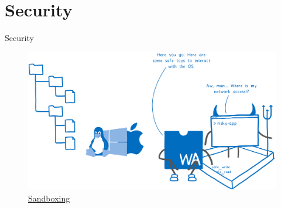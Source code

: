 \documentclass{beamer}
\begin{document}
\section{Security}

\begin{frame}{Security}
    \begin{figure}
        \includegraphics[scale=0.07]{./images/sandbox.png}
        \caption{\href{https://hacks.mozilla.org/2019/03/standardizing-wasi-a-webassembly-system-interface/}{Sandboxing}}
    \end{figure}
\end{frame}
\end{document}
